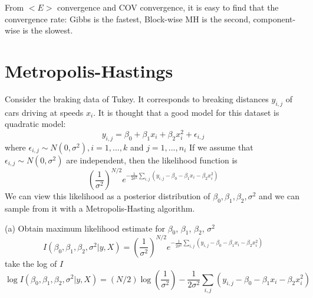 \documentclass{article}
\begin{document}
From $<E>$ convergence and COV convergence, it is easy to find that 
the convergence rate: Gibbs is the fastest, Block-wise MH is the second, component-wise is the slowest.

\newpage
\section{Metropolis-Hastings}
Consider the braking data of Tukey. It corresponds to breaking distances $y_{i,j}$ of cars driving at speeds $x_{i}$. It is thought that a good model for this dataset is quadratic model:
\begin{equation}
    y_{i,j} = \beta_{0} +\beta_{1}x_{i} + \beta_{2}x_{i}^{2}+\epsilon_{i,j}
\end{equation}
where $\epsilon_{i,j} \sim  N(0,\sigma^2), i=1, ..., k$ and $j=1,...,n_{i}$
If we assume that $\epsilon_{i,j} \sim  N(0,\sigma^2)$ are independent, then the likelihood function is 
\begin{equation}
    (\frac{1}{\sigma^2})^{N/2} e^{-\frac{1}{2\sigma^2}\sum_{i,j}(y_{i,j}-\beta_{0}-\beta_{1}x_{i} - \beta_{2}x_{i}^{2})}
\end{equation}
We can view this likelihood as a posterior distribution of $\beta_{0},\beta_{1},\beta_{2},\sigma^2$ and we can sample from it with a Metropolis-Hasting algorithm.

(a) Obtain maximum likelihood estimate for $\beta_{0}$, $\beta_{1}$, $\beta_{2}$, $\sigma^{2}$
\begin{equation}
    I(\beta_{0},\beta_{1},\beta_{2},\sigma^2 | y,X ) =  (\frac{1}{\sigma^2})^{N/2} e^{-\frac{1}{2\sigma^2}\sum_{i,j}(y_{i,j}-\beta_{0}-\beta_{1}x_{i} - \beta_{2}x_{i}^{2})}
\end{equation}
take the log of $I$
\begin{equation}
    \log I(\beta_{0},\beta_{1},\beta_{2},\sigma^2 | y,X) = (N/2) \log(\frac{1}{\sigma^2}) -\frac{1}{2\sigma^2}\sum_{i,j}(y_{i,j}-\beta_{0}-\beta_{1}x_{i} - \beta_{2}x_{i}^{2})
\end{equation}
\end{document}
